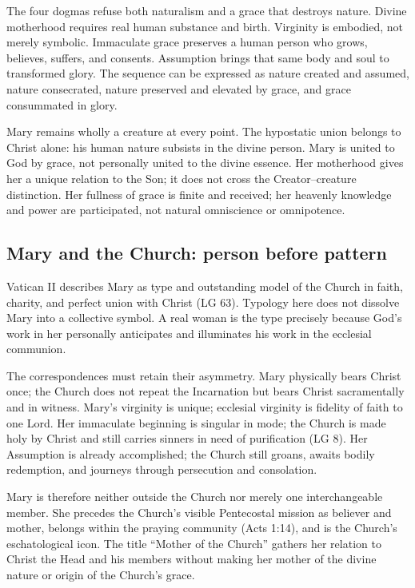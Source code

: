 The four dogmas refuse both naturalism and a grace that destroys nature. Divine motherhood requires real human substance and birth. Virginity is embodied, not merely symbolic. Immaculate grace preserves a human person who grows, believes, suffers, and consents. Assumption brings that same body and soul to transformed glory. The sequence can be expressed as nature created and assumed, nature consecrated, nature preserved and elevated by grace, and grace consummated in glory.

Mary remains wholly a creature at every point. The hypostatic union belongs to Christ alone: his human nature subsists in the divine person. Mary is united to God by grace, not personally united to the divine essence. Her motherhood gives her a unique relation to the Son; it does not cross the Creator--creature distinction. Her fullness of grace is finite and received; her heavenly knowledge and power are participated, not natural omniscience or omnipotence.

\subsection{Mary and the Church: person before pattern}

Vatican II describes Mary as type and outstanding model of the Church in faith, charity, and perfect union with Christ (LG 63). Typology here does not dissolve Mary into a collective symbol. A real woman is the type precisely because God's work in her personally anticipates and illuminates his work in the ecclesial communion.

The correspondences must retain their asymmetry. Mary physically bears Christ once; the Church does not repeat the Incarnation but bears Christ sacramentally and in witness. Mary's virginity is unique; ecclesial virginity is fidelity of faith to one Lord. Her immaculate beginning is singular in mode; the Church is made holy by Christ and still carries sinners in need of purification (LG 8). Her Assumption is already accomplished; the Church still groans, awaits bodily redemption, and journeys through persecution and consolation.

Mary is therefore neither outside the Church nor merely one interchangeable member. She precedes the Church's visible Pentecostal mission as believer and mother, belongs within the praying community (Acts 1:14), and is the Church's eschatological icon. The title ``Mother of the Church'' gathers her relation to Christ the Head and his members without making her mother of the divine nature or origin of the Church's grace.

